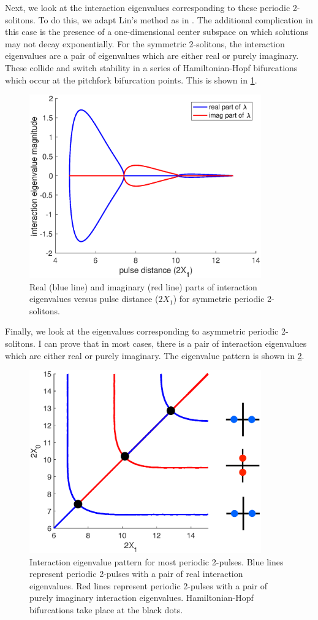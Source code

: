 \documentclass[12pt,reqno]{amsart}
\theoremstyle{definition}
\theoremstyle{remark}
\begin{document}
Next, we look at the interaction eigenvalues corresponding to these periodic 2-solitons. To do this, we adapt Lin's method as in \cite{Sandstede1998}. The additional complication in this case is the presence of a one-dimensional center subspace on which solutions may not decay exponentially. For the symmetric 2-solitons, the interaction eigenvalues are a pair of eigenvalues which are either real or purely imaginary. These collide and switch stability in a series of Hamiltonian-Hopf bifurcations which occur at the pitchfork bifurcation points. This is shown in \cref{fig:periodicequaleigbif}.

\begin{figure}[ht]
\includegraphics[width=10cm]{periodicequaleigbif}
\caption{Real (blue line) and imaginary (red line) parts of interaction eigenvalues versus pulse distance ($2 X_1$) for symmetric periodic 2-solitons.}
\label{fig:periodicequaleigbif}
\end{figure}

Finally, we look at the eigenvalues corresponding to asymmetric periodic 2-solitons. I can prove that in most cases, there is a pair of interaction eigenvalues which are either real or purely imaginary. The eigenvalue pattern is shown in \cref{fig:2periodiceigpattern}.

\begin{figure}[ht]
\includegraphics[width=10cm]{2periodiceigpattern.eps}
\caption{Interaction eigenvalue pattern for most periodic 2-pulses. Blue lines represent periodic 2-pulses with a pair of real interaction eigenvalues. Red lines represent periodic 2-pulses with a pair of purely imaginary interaction eigenvalues. Hamiltonian-Hopf bifurcations take place at the black dots.}
\label{fig:2periodiceigpattern}
\end{figure}
\end{document}
